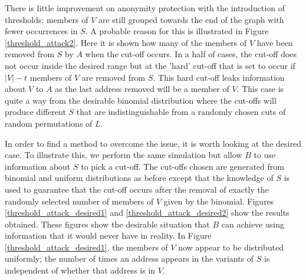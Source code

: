 \documentclass[ %
                    author={Luke Murray},
                supervisor={Dr. Simon Hollis},
                     title={Shadow Peer-to-Peer Networks},
                  subtitle={},
                    degree={MEng},
                      year={2013} ]{thesis}
\begin{document}
There is little improvement on anonymity protection with the introduction of thresholds; members of $V$ are still grouped towards the end of the graph with fewer occurrences in $S$. A probable reason for this is illustrated in Figure \ref{threshold_attack2}. Here it is shown how many of the members of $V$ have been removed from $S$ by $A$ when the cut-off occurs. In a half of cases, the cut-off does not occur inside the desired range but at the 'hard' cut-off that is set to occur if $|V| - t$ members of $V$ are removed from $S$. This hard cut-off leaks information about $V$ to $A$ as the last address removed will be a member of $V$. This case is quite a way from the desirable binomial distribution where the cut-offs will produce different $S$ that are indistinguishable from a randomly chosen cuts of random permutations of $L$.

In order to find a method to overcome the issue, it is worth looking at the desired case. To illustrate this, we perform the same simulation but allow $B$ to use information about $S$ to pick a cut-off. The cut-offs chosen are generated from binomial and uniform distributions as before except that the knowledge of $S$ is used to guarantee that the cut-off occurs after the removal of exactly the randomly selected number of members of $V$ given by the binomial. Figures \ref{threshold_attack_desired1} and \ref{threshold_attack_desired2} show the results obtained. These figures show the desirable situation that $B$ can achieve using information that it would never have in reality. In Figure \ref{threshold_attack_desired1}, the members of $V$ now appear to be distributed uniformly; the number of times an address appears in the variants of $S$ is independent of whether that address is in $V$.
\end{document}
